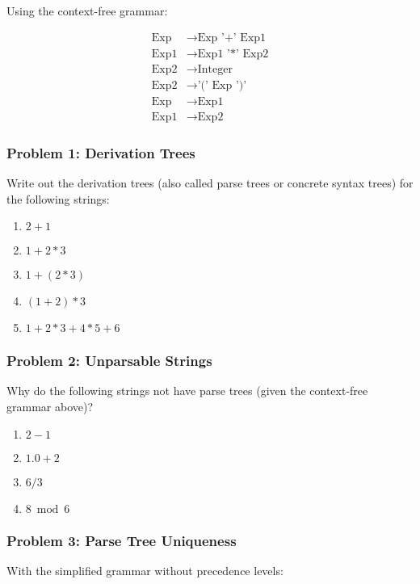 \documentclass{article}
\theoremstyle{plain}
\theoremstyle{definition}
\theoremstyle{remark}
\begin{document}
Using the context-free grammar:

\begin{align}
\text{Exp} &\to \text{Exp '+' Exp1} \\
\text{Exp1} &\to \text{Exp1 '*' Exp2} \\
\text{Exp2} &\to \text{Integer} \\
\text{Exp2} &\to \text{'(' Exp ')'} \\
\text{Exp} &\to \text{Exp1} \\
\text{Exp1} &\to \text{Exp2}
\end{align}

\subsubsection{Problem 1: Derivation Trees}

Write out the derivation trees (also called parse trees or concrete syntax trees) for the following strings:

\begin{enumerate}[label=(\alph*)]
    \item $2+1$
    \item $1+2*3$
    \item $1+(2*3)$
    \item $(1+2)*3$
    \item $1+2*3+4*5+6$
\end{enumerate}

\subsubsection{Problem 2: Unparsable Strings}

Why do the following strings not have parse trees (given the context-free grammar above)?

\begin{enumerate}[label=(\alph*)]
    \item $2-1$
    \item $1.0+2$
    \item $6/3$
    \item $8 \bmod 6$
\end{enumerate}

\subsubsection{Problem 3: Parse Tree Uniqueness}

With the simplified grammar without precedence levels:
\end{document}
